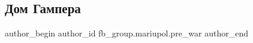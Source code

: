  
 
 
 
 

\subsection{Дом Гампера}
\label{sec:15_02_2023.fb.fb_group.mariupol.pre_war.3.dom_gampera}

\ifcmt
 author_begin
   author_id fb_group.mariupol.pre_war
 author_end
\fi
